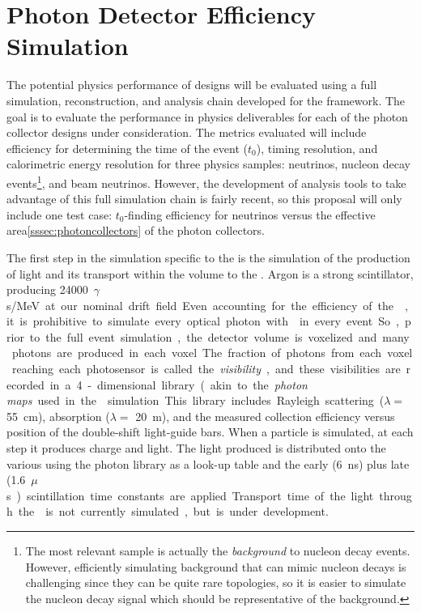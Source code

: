 \section{Photon Detector Efficiency Simulation}
\label{sec:fdsp-pd-simphys}

The potential physics performance of  designs will be evaluated using a full simulation, reconstruction, and analysis chain developed for the \larsoft framework. The goal is to evaluate the performance in physics deliverables for each of the photon collector designs under consideration. The metrics evaluated will include efficiency for determining the time of the event ($t_0$), timing resolution, and calorimetric energy resolution for three physics samples:  neutrinos, nucleon decay events\footnote{The most relevant sample is actually the \emph{background} to nucleon decay events. However, efficiently simulating background that can mimic nucleon decays is challenging since they can be quite rare topologies, so it is easier to simulate the nucleon decay signal which should be representative of the background.}, and beam neutrinos. However, the development of analysis tools to take advantage of this full simulation chain is fairly recent, so this proposal will only include one test case: $t_0$-finding efficiency for  neutrinos versus the effective area\ref{sssec:photoncollectors} of the photon collectors.

The first step in the simulation specific to the  is the simulation of the production of light and its transport within the volume to the . Argon is a strong scintillator, producing \SI{24000}{$\gamma$s/MeV} at our nominal drift field. Even accounting for the efficiency of the , it is prohibitive to simulate every optical photon with  in every event. So, prior to the full event simulation, the detector volume is voxelized and many photons are produced in each voxel. The fraction of photons from each voxel reaching each photosensor is called the \textit{visibility}, and these visibilities are recorded in a 4-dimensional library (akin to the \textit{photon maps} used in the  simulation.
This library includes Rayleigh scattering ($\lambda=$ \SI{55}{cm}\cite{Grace:2015yta}), absorption ($\lambda=$ \SI{20}{m}), and the measured collection efficiency versus position of the double-shift light-guide bars. When a particle is simulated, at each step it produces charge and light. The light produced is distributed onto the various  using the photon library as a look-up table and the early (\SI{6}{ns}) plus late (\SI{1.6}{$\mu$s}) scintillation time constants are applied. Transport time of the light through the \lar is not currently simulated, but is under development.

